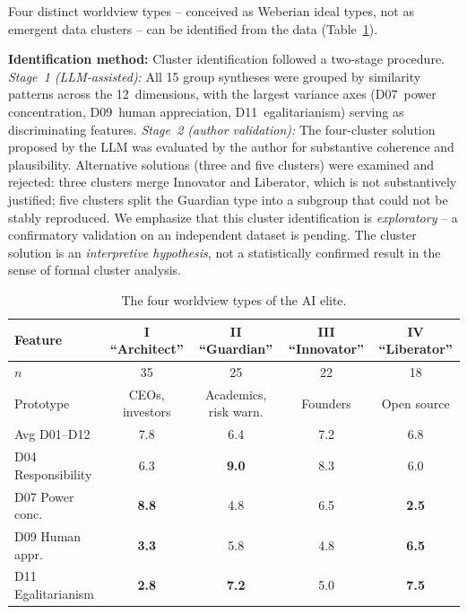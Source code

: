 \documentclass[12pt,a4paper]{article}
\begin{document}
Four distinct worldview types -- conceived as Weberian ideal types, not as emergent data clusters -- can be identified from the data (Table~\ref{tab:typen}).

\textbf{Identification method:} Cluster identification followed a two-stage procedure. \emph{Stage~1 (LLM-assisted):} All 15 group syntheses were grouped by similarity patterns across the 12~dimensions, with the largest variance axes (D07~power concentration, D09~human appreciation, D11~egalitarianism) serving as discriminating features. \emph{Stage~2 (author validation):} The four-cluster solution proposed by the LLM was evaluated by the author for substantive coherence and plausibility. Alternative solutions (three and five clusters) were examined and rejected: three clusters merge Innovator and Liberator, which is not substantively justified; five clusters split the Guardian type into a subgroup that could not be stably reproduced. We emphasize that this cluster identification is \emph{exploratory} -- a confirmatory validation on an independent dataset is pending. The cluster solution is an \emph{interpretive hypothesis}, not a statistically confirmed result in the sense of formal cluster analysis.

\begin{table}[htbp]
  \centering
  \caption{The four worldview types of the AI elite.}
  \label{tab:typen}
  \small
  \begin{tabular}{l c c c c}
    \toprule
    \textbf{Feature} & \textbf{I ``Architect''} & \textbf{II ``Guardian''} & \textbf{III ``Innovator''} & \textbf{IV ``Liberator''} \\
    \midrule
    $n$ & 35 & 25 & 22 & 18 \\
    Prototype & CEOs, investors & Academics, risk warn. & Founders & Open source \\
    Avg D01--D12 & 7.8 & 6.4 & 7.2 & 6.8 \\
    D04 Responsibility & 6.3 & \textbf{9.0} & 8.3 & 6.0 \\
    D07 Power conc. & \textbf{8.8} & 4.8 & 6.5 & \textbf{2.5} \\
    D09 Human appr. & \textbf{3.3} & 5.8 & 4.8 & \textbf{6.5} \\
    D11 Egalitarianism & \textbf{2.8} & \textbf{7.2} & 5.0 & \textbf{7.5} \\
    \bottomrule
  \end{tabular}
\end{table}
\end{document}
